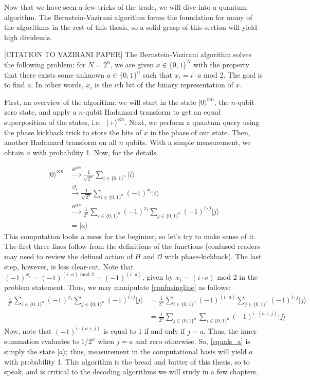 \documentclass[12pt,twoside]{reedthesis}
\theoremstyle{definition}
\newcommand{\ketz}{\ensuremath{\lvert 0\rangle}\xspace}
\newcommand{\ket}[1]{\ensuremath{\lvert #1\rangle}\xspace}
\newcommand{\Hplus}{\ensuremath{\lvert + \rangle}\xspace}
\begin{document}
Now that we have seen a few tricks of the trade, we will dive into a quantum algorithm. The Bernstein-Vazirani algorithm forms the foundation for many of the algorithms in the rest of this thesis, so a solid grasp of this section will yield high dividends. 

[CITATION TO VAZIRANI PAPER] The Bernstein-Vazirani algorithm solves the following problem: for $N = 2^n$, we are given $x \in \{0,1\}^N$ with the property that there exists some unknown $a \in \{0,1\}^n$ such that $x_i = i \cdot a$ mod 2. The goal is to find $a$. In other words, $x_i$ is the $i$th bit of the binary representation of $x$. 

First, an overview of the algorithm: we will start in the state $\ketz^{\otimes n}$, the $n$-qubit zero state, and apply a $n$-qubit Hadamard transform to get an equal superposition of the states, i.e.~ $\Hplus^{\otimes n}$. Next, we perform a quantum query using the phase kickback trick to store the bits of $x$ in the phase of our state. Then, another Hadamard transform on all $n$ qubits. With a simple measurement, we obtain $a$ with probability 1. Now, for the details.

\begin{align}
 \ketz^{\otimes n}
& \xrightarrow{H^{\otimes n}}\frac{1}{\sqrt{2^n}} \sum_{i \in \{0,1\}^n} \ket{i} \\
& \xrightarrow{\mathcal{O}_x} \frac{1}{\sqrt{2^n}} \sum_{i \in \{0,1\}^n} (-1)^{x_i}\ket{i}\\
& \xrightarrow{H^{\otimes n}} \frac{1}{2^n} \sum_{i \in \{0,1\}^n} (-1)^{x_i} \sum_{j \in \{0,1\}^n} (-1)^{i \cdot j} \ket{j} \label{confusingline}\\
& = \ket{a}
\end{align}
This computation looks a mess for the beginner, so let's try to make sense of it. The first three lines follow from the definitions of the functions (confused readers may need to review the defined action of $H$ and $\mathcal{O}$ with phase-kickback). The last step, however, is less clear-cut. Note that $(-1)^{x_i} = (-1)^{(i \cdot a) \text{ mod } 2} = (-1)^{(i \cdot a)}$, given by $x_i = (i \cdot a)$ mod 2 in the problem statement. Thus, we may manipulate \ref{confusingline} as follows:
\begin{align}
 \frac{1}{2^n} \sum_{i \in \{0,1\}^n} (-1)^{x_i} \sum_{j \in \{0,1\}^n} (-1)^{i \cdot j} \ket{j}
& = \frac{1}{2^n} \sum_{i \in \{0,1\}^n} (-1)^{(i \cdot a)} \sum_{j \in \{0,1\}^n} (-1)^{i \cdot j} \ket{j} \\
& = \frac{1}{2^n}  \sum_{j \in \{0,1\}^n}\sum_{i \in \{0,1\}^n} (-1)^{i \cdot(a + j)}  \ket{j} \label{equals_a}
\end{align}
Now, note that $(-1)^{i \cdot(a + j)}$ is equal to 1 if and only if $j = a$. Thus, the inner summation evaluates to $1/2^n$ when $j =a$ and zero otherwise. So, \ref{equals_a} is simply the state $\ket{a}$; thus, measurement in the computational basis will yield $a$ with probability 1. This algorithm is the bread and butter of this thesis, so to speak, and is critical to the decoding algorithms we will study in a few chapters. 
\end{document}
